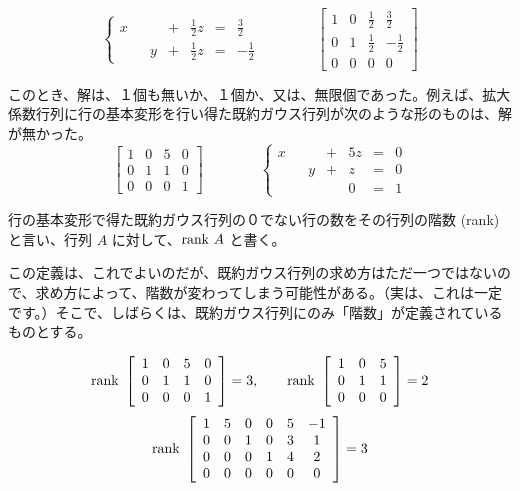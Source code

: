 $$\left\{\begin{array}{rrrrrrr}
x & &  & + & \frac12z & = & \frac32\\
 & & y  & + & \frac12z & = & -\frac12
\end{array}\right. \qquad\qquad  
\left[\begin{array}{rrrr}
1 & 0 & \frac12 &  \frac32\\
0 & 1 & \frac12 & -\frac12\\
0 & 0 & 0 & 0
\end{array}\right]$$

このとき、解は、１個も無いか、１個か、又は、無限個であった。例えば、拡大係数行列に行の基本変形を行い得た既約ガウス行列が次のような形のものは、解が無かった。
$$\left[\begin{array}{cccc}
1 & 0 & 5 & 0\\
0 & 1 & 1 & 0\\
0 & 0 & 0 & 1
\end{array}\right]
\qquad\qquad
\left\{\begin{array}{rrrrrrr}
x & &  & + & 5z & = & 0\\
 & & y  & + & z & = & 0\\
 & & & & 0 & = & 1
\end{array}\right.$$

\begin{definition}
行の基本変形で得た既約ガウス行列の０でない行の数をその行列の{\gt 階数 (rank)} と言い、行列
$A$ に対して、$\mbox{{\rm rank }} A$ と書く。
\end{definition}

この定義は、これでよいのだが、既約ガウス行列の求め方はただ一つではないので、求め方によって、階数が変わってしまう可能性がある。（実は、これは一定です。）そこで、しばらくは、既約ガウス行列にのみ「階数」が定義されているものとする。

\begin{eg}
$$\mbox{{\rm rank }} \left[\begin{array}{cccc}
1 & 0 & 5 & 0\\
0 & 1 & 1 & 0\\
0 & 0 & 0 & 1
\end{array}\right] = 3,\qquad 
\mbox{{\rm rank }} \left[\begin{array}{ccc}
1 & 0 & 5 \\
0 & 1 & 1 \\
0 & 0 & 0 
\end{array}\right] = 2$$
$$\mbox{{\rm rank }}\left[\begin{array}{cccccc}
1 & 5 & 0 & 0 & 5 & -1\\
0 & 0 & 1 & 0 & 3 & 1\\
0 & 0 & 0 & 1 & 4 & 2\\
0 & 0 & 0 & 0 & 0 & 0
\end{array}\right] = 3$$
\end{eg}

